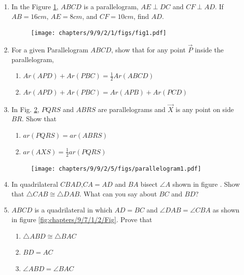 \renewcommand{\theequation}{\theenumi}
\begin{enumerate}[label=\arabic*.,ref=\thesubsection.\theenumi]
\item In the Figure \ref{fig:9/9/2/1}, $ABCD$ is a parallelogram, $AE \perp DC$ and $CF \perp AD$. If $AB = 16 cm$, $AE = 8 cm$, and $CF = 10cm$, find $AD$.
	\begin{figure}[!ht]
		\centering
 \texttt{[image: chapters/9/9/2/1/figs/fig1.pdf]}
		\caption{}
		\label{fig:9/9/2/1}
  	\end{figure}
%
\item For a given Parallelogram $ABCD$, show that for any
point $\vec{P}$ inside the parallelogram,
\begin{enumerate}
	\item $Ar(APD)+Ar(PBC) = \frac{1}{2}Ar(ABCD)$
	\item $Ar(APD)+Ar(PBC) = Ar(APB)+Ar(PCD)$
\end{enumerate}
%
\item In Fig.
		\ref{fig:9/9/2/5},
$PQRS$ and $ABRS$ are parallelograms
and $\vec{X}$ is any point on side $BR$. Show that  
\begin{enumerate}
    \item $ar (PQRS) = ar(ABRS)$
	    \label{prop:9/9/2/5}
    \item $ar(AXS) = \frac{1}{2} ar(PQRS)$
\end{enumerate}
	\begin{figure}[!ht]
		\centering
 \texttt{[image: chapters/9/9/2/5/figs/parallelogram1.pdf]}
		\caption{}
		\label{fig:9/9/2/5}
  	\end{figure}
%
%	
\item In quadrilateral $CBAD$,$CA = AD$ and $BA$ bisect $\angle{A}$ shown in figure . Show that $\triangle{CAB} \cong \triangle{DAB}$. What can you say about $BC$ and $BD$? \\
	\solution
%
\item $ABCD$ is a quadrilateral in which $AD = BC$ and $\angle{DAB} = \angle{CBA}$ as shown in figure \ref{fig:chapters/9/7/1/2/Fig}. Prove that
\begin{enumerate}
\item $\triangle{ABD} \cong \triangle{BAC}$
  \item $BD = AC$
  \item $\angle{ABD} = \angle{BAC}$

\end{enumerate}
\end{enumerate}
